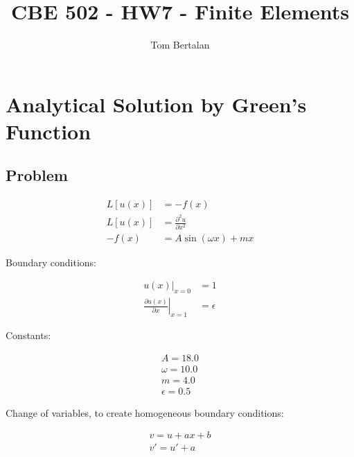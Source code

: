 \documentclass[10pt]{article}
\title{CBE 502 - HW7 - Finite Elements}
\author{Tom Bertalan}
\begin{document}
\maketitle

\tableofcontents

\listoffigures

\section{Analytical Solution by Green's Function}
\label{sec:green}

\subsection{Problem}

\begin{equation}
\label{eqn:problem}
\begin{split}
 L[u(x)] &= -f(x) \\
L[u(x)] &=  \frac{\partial^2 u}{\partial x^2} \\
-f(x) &= A \sin (\omega x) + m x
\end{split}
\end{equation}

Boundary conditions:

\begin{equation}
 \begin{split}
    \left. u(x) \right| _{x=0} &= 1 \\
    \left. \frac{\partial u(x)}{\partial x}\right|_{x=1} &= \epsilon
 \end{split}
\end{equation}

Constants:

\begin{equation}
\label{eqn:constants}
 \begin{split}
    A = 18.0 \\
    \omega = 10.0 \\
    m = 4.0 \\
    \epsilon = 0.5
 \end{split}
\end{equation}


Change of variables, to create homogeneous boundary conditions:

\begin{equation}
\label{eqn:changeofvars}
 \begin{split}
  v = u + a x + b \\
  v' = u' + a \\
 \end{split}
\end{equation}
\end{document}
